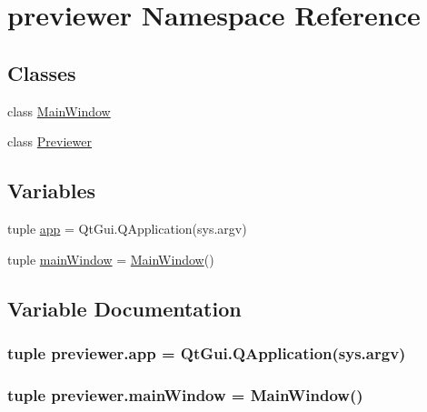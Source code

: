 \hypertarget{namespacepreviewer}{}\section{previewer Namespace Reference}
\label{namespacepreviewer}
\subsection*{Classes}
\begin{DoxyCompactItemize}
\item 
class \hyperlink{classpreviewer_1_1MainWindow}{Main\+Window}
\item 
class \hyperlink{classpreviewer_1_1Previewer}{Previewer}
\end{DoxyCompactItemize}
\subsection*{Variables}
\begin{DoxyCompactItemize}
\item 
tuple \hyperlink{namespacepreviewer_a4793afca24766ab0669748999e63b64d}{app} = Qt\+Gui.\+Q\+Application(sys.\+argv)
\item 
tuple \hyperlink{namespacepreviewer_a2077bd8b1cab00d71b0bd86db3dc641e}{main\+Window} = \hyperlink{classpreviewer_1_1MainWindow}{Main\+Window}()
\end{DoxyCompactItemize}


\subsection{Variable Documentation}
\hypertarget{namespacepreviewer_a4793afca24766ab0669748999e63b64d}{}
\subsubsection[{app}]{\setlength{\rightskip}{0pt plus 5cm}tuple previewer.\+app = Qt\+Gui.\+Q\+Application(sys.\+argv)}\label{namespacepreviewer_a4793afca24766ab0669748999e63b64d}
\hypertarget{namespacepreviewer_a2077bd8b1cab00d71b0bd86db3dc641e}{}
\subsubsection[{main\+Window}]{\setlength{\rightskip}{0pt plus 5cm}tuple previewer.\+main\+Window = {\bf Main\+Window}()}\label{namespacepreviewer_a2077bd8b1cab00d71b0bd86db3dc641e}
